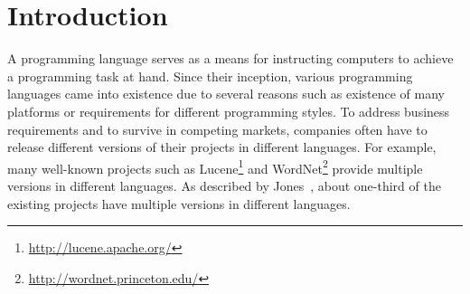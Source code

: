 \section{Introduction}
\label{sec:introduction}

A programming language serves as a means for instructing computers
to achieve a programming task at hand. Since their inception,
various programming languages came into existence due to several reasons
such as existence of many platforms or requirements for different
programming styles.  To address business requirements
and to survive in competing markets, companies often have to release
different versions of their projects in different languages. For
example, many well-known projects such as
Lucene\footnote{\url{http://lucene.apache.org/}} and
WordNet\footnote{\url{http://wordnet.princeton.edu/}} provide
multiple versions in different languages. As described by
Jones~\cite{jones1998estimating}, about one-third of the existing
projects have multiple versions in different languages.


